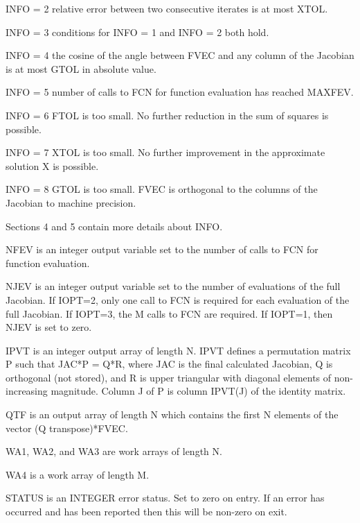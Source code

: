 \documentclass[11pt,twoside,nolof]{starlink}
\begin{document}
\begin{terminalv}
         INFO = 2  relative error between two consecutive iterates is
                   at most XTOL.

         INFO = 3  conditions for INFO = 1 and INFO = 2 both hold.

         INFO = 4  the cosine of the angle between FVEC and any column
                   of the Jacobian is at most GTOL in absolute value.

         INFO = 5  number of calls to FCN for function evaluation
                   has reached MAXFEV.

         INFO = 6  FTOL is too small.  No further reduction in the sum
                   of squares is possible.

         INFO = 7  XTOL is too small.  No further improvement in the
                   approximate solution X is possible.

         INFO = 8  GTOL is too small.  FVEC is orthogonal to the
                   columns of the Jacobian to machine precision.

         Sections 4 and 5 contain more details about INFO.

       NFEV is an integer output variable set to the number of calls to
         FCN for function evaluation.

       NJEV is an integer output variable set to the number of
         evaluations of the full Jacobian.  If IOPT=2, only one call to
         FCN is required for each evaluation of the full Jacobian.
         If IOPT=3, the M calls to FCN are required.
         If IOPT=1, then NJEV is set to zero.

       IPVT is an integer output array of length N.  IPVT defines a
         permutation matrix P such that JAC*P = Q*R, where JAC is the
         final calculated Jacobian, Q is orthogonal (not stored), and R
         is upper triangular with diagonal elements of non-increasing
         magnitude.  Column J of P is column IPVT(J) of the identity
         matrix.

       QTF is an output array of length N which contains the first N
         elements of the vector (Q transpose)*FVEC.

       WA1, WA2, and WA3 are work arrays of length N.

       WA4 is a work array of length M.

       STATUS is an INTEGER error status. Set to zero on entry.
              If an error has occurred and has been reported then
              this will be non-zero on exit.


\end{terminalv}
\end{document}

